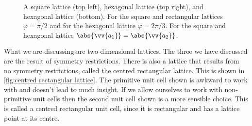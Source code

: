 \documentclass[fleqn]{NotesClass}
\begin{document}
\begin{figure}
        \caption[Square, rectangular, and hexagonal lattice vectors in 2D]{A square lattice (top left), hexagonal lattice (top right), and hexagonal lattice (bottom). For the square and rectangular lattices \(\varphi = \pi/2\) and for the hexagonal lattice \(\varphi = 2\pi/3\). For the square and hexagonal lattice \(\abs{\vv{a_1}} = \abs{\vv{a_2}}\).}
        \label{fig:square rectangle hexagon lattice}
    \end{figure}
    
    What we are discussing are two-dimensional lattices.
    The three we have discussed are the result of symmetry restrictions.
    There is also a lattice that results from no symmetry restrictions, called the centred rectangular lattice.
    This is shown in \cref{fig:centred rectangular lattice}.
    The primitive unit cell shown is awkward to work with and doesn't lead to much insight.
    If we allow ourselves to work with non-primitive unit cells then the second unit cell shown is a more sensible choice.
    This is called a centred rectangular unit cell, since it is rectangular and has a lattice point at its centre.
    
\end{document}
